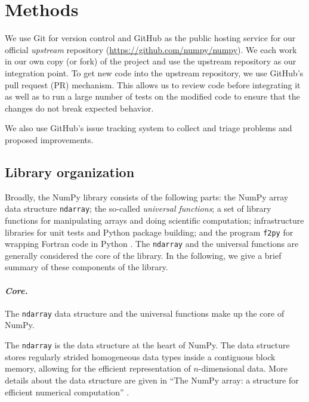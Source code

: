 \section*{Methods}

We use Git for version control and GitHub as the public hosting service for our
official \emph{upstream} repository (\url{https://github.com/numpy/numpy}).
We each work in our own copy (or fork) of the project and use the
upstream repository as our integration point.
To get new code into the upstream repository, we use GitHub's
pull request (PR) mechanism.
This allows us to review code before integrating it as well as to run a
large number of tests on the modified code to ensure that the changes
do not break expected behavior.

We also use GitHub's issue tracking system to collect and triage problems and
proposed improvements.


\subsection*{Library organization}

Broadly, the NumPy library consists of the following parts:
the NumPy array data structure \texttt{ndarray}; the so-called \emph{universal functions};
a set of library functions for manipulating arrays and doing scientific
computation; infrastructure libraries for unit tests and Python package
building; and the program \texttt{f2py} for wrapping Fortran code in Python \cite{peterson2009f2py}.
The \texttt{ndarray} and the universal functions are generally considered
the core of the library.
In the following, we give a brief summary of these components of the
library.

\paragraph{\emph{Core.}}  The \texttt{ndarray} data structure and the
universal functions make up the core of NumPy.

The \texttt{ndarray} is the data structure at the heart of NumPy.
The data structure stores regularly strided homogeneous data types
inside a contiguous block memory, allowing for the efficient representation
of $n$-dimensional data.
More details about the data structure are given in ``The NumPy array:
a structure for efficient numerical computation'' \cite{vanderwalt2011numpy}.

